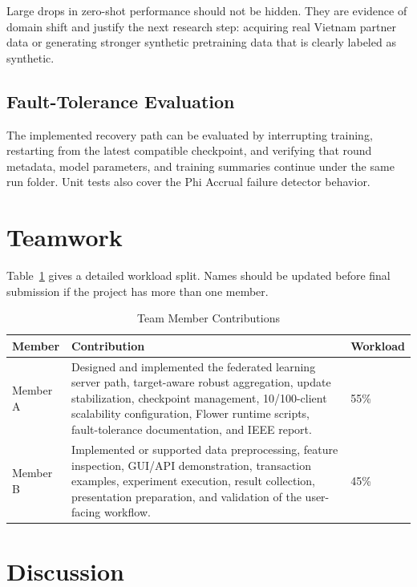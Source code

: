 \documentclass[conference]{IEEEtran}
\begin{document}
Large drops in zero-shot performance should not be hidden. They are evidence of
domain shift and justify the next research step: acquiring real Vietnam partner
data or generating stronger synthetic pretraining data that is clearly labeled
as synthetic.

\subsection{Fault-Tolerance Evaluation}

The implemented recovery path can be evaluated by interrupting training,
restarting from the latest compatible checkpoint, and verifying that round
metadata, model parameters, and training summaries continue under the same run
folder. Unit tests also cover the Phi Accrual failure detector behavior.

\section{Teamwork}

Table~\ref{tab:teamwork} gives a detailed workload split. Names should be
updated before final submission if the project has more than one member.

\begin{table}[t]
\caption{Team Member Contributions}
\label{tab:teamwork}
\centering
\begin{tabular}{p{}p{}p{}}
\toprule
\textbf{Member} & \textbf{Contribution} & \textbf{Workload} \\
\midrule
Member A & Designed and implemented the federated learning server path, target-aware robust aggregation, update stabilization, checkpoint management, 10/100-client scalability configuration, Flower runtime scripts, fault-tolerance documentation, and IEEE report. & 55\% \\
Member B & Implemented or supported data preprocessing, feature inspection, GUI/API demonstration, transaction examples, experiment execution, result collection, presentation preparation, and validation of the user-facing workflow. & 45\% \\
\bottomrule
\end{tabular}
\end{table}

\section{Discussion}
\end{document}
